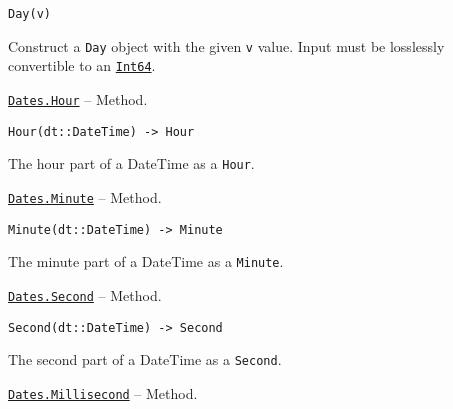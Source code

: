 \begin{adjustwidth}{2em}{0pt}


\begin{verbatim}
Day(v)
\end{verbatim}

Construct a \texttt{Day} object with the given \texttt{v} value. Input must be losslessly convertible to an \hyperlink{7720564657383125058}{\texttt{Int64}}.



\end{adjustwidth}
\hypertarget{11671105558328225558}{}
\hyperlink{11671105558328225558}{\texttt{Dates.Hour}}  -- {Method.}

\begin{adjustwidth}{2em}{0pt}


\begin{verbatim}
Hour(dt::DateTime) -> Hour
\end{verbatim}

The hour part of a DateTime as a \texttt{Hour}.



\end{adjustwidth}
\hypertarget{15437593953944371601}{}
\hyperlink{15437593953944371601}{\texttt{Dates.Minute}}  -- {Method.}

\begin{adjustwidth}{2em}{0pt}


\begin{verbatim}
Minute(dt::DateTime) -> Minute
\end{verbatim}

The minute part of a DateTime as a \texttt{Minute}.



\end{adjustwidth}
\hypertarget{544402402471521748}{}
\hyperlink{544402402471521748}{\texttt{Dates.Second}}  -- {Method.}

\begin{adjustwidth}{2em}{0pt}


\begin{verbatim}
Second(dt::DateTime) -> Second
\end{verbatim}

The second part of a DateTime as a \texttt{Second}.



\end{adjustwidth}
\hypertarget{9366634148855607364}{}
\hyperlink{9366634148855607364}{\texttt{Dates.Millisecond}}  -- {Method.}

